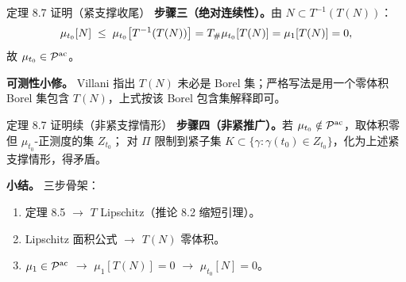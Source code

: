 \begin{frame}{定理 8.7 证明（紧支撑收尾）}
  \textbf{步骤三（绝对连续性）。}\proofskipnote 由 $N\subset T^{-1}(T(N))$：
  \[
    \mu_{t_{0}}[N]\;\le\;\mu_{t_{0}}\!\left[T^{-1}(T(N))\right]
    ={T}_{\#}\mu_{t_{0}}[T(N)]=\mu_{1}[T(N)]=0,
  \]
  故 $\mu_{t_{0}}\in\mathcal{P}^{\mathrm{ac}}$。

  \textbf{可测性小修。} Villani 指出 $T(N)$ 未必是 Borel 集；严格写法是用一个零体积 Borel 集包含 $T(N)$，上式按该 Borel 包含集解释即可。

\end{frame}

\begin{frame}{定理 8.7 证明续（非紧支撑情形）}
  \textbf{步骤四（非紧推广）。}\proofskipnote 若 $\mu_{t_0}\notin\mathcal{P}^{\mathrm{ac}}$，取体积零但 $\mu_{t_0}$-正测度的集 $Z_{t_0}$；
  对 $\Pi$ 限制到紧子集 $K\subset\{\gamma\colon\gamma(t_0)\in Z_{t_0}\}$，化为上述紧支撑情形，得矛盾。

  \textbf{小结。} 三步骨架：
  \begin{enumerate}\small
    \item 定理 8.5 $\to$ $T$ Lipschitz（推论 8.2 缩短引理）。
    \item Lipschitz 面积公式 $\to$ $T(N)$ 零体积。
    \item $\mu_1\in\mathcal{P}^{\mathrm{ac}}$ $\to$ $\mu_1[T(N)]=0$ $\to$ $\mu_{t_0}[N]=0$。
  \end{enumerate}

\end{frame}

